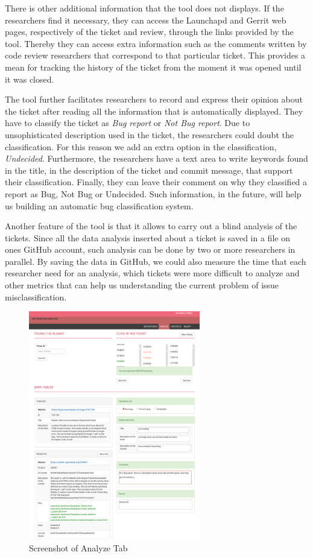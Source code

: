 \documentclass[runningheads,a4paper]{llncs}
\begin{document}
There is other additional information that the tool does not displays. If the researchers find it necessary, they can access the Launchapd and Gerrit web pages, respectively of the ticket and review, through the links provided by the tool. Thereby they can access extra information such as the comments written by code review researchers that correspond to that particular ticket. This provides a mean for tracking the history of the ticket from the moment it was opened until it was closed.

The tool further facilitates researchers to record and express their opinion about the ticket after reading all the information that is automatically displayed. They have to classify the ticket as \textit{Bug report} or \textit{Not Bug report}. Due to unsophisticated description used in the ticket, the researchers could doubt the classification. For this reason we add an extra option in the classification, \textit{Undecided}. Furthermore, the researchers have a text area to write keywords found in the title, in the description of the ticket and commit message, that support their classification.
Finally, they can leave their comment on why they classified a report as Bug, Not Bug or Undecided. Such information, in the future, will help us building an automatic bug classification system.

Another feature of the tool is that it allows to carry out a blind analysis of the tickets. Since all the data analysis inserted about a ticket is saved in a file on ones GitHub account, such analysis can be done by two or more researchers in parallel. By saving the data in GitHub, we could also measure the time that each researcher need for an analysis, which tickets were more difficult to analyze and other metrics that can help us understanding the current problem of issue misclassification.

\begin{figure}
\centering
\includegraphics[height=10cm]{index2.png}
\caption{Screenshot of Analyze Tab}   
\label{fig:2}       %
\end{figure}
\end{document}
